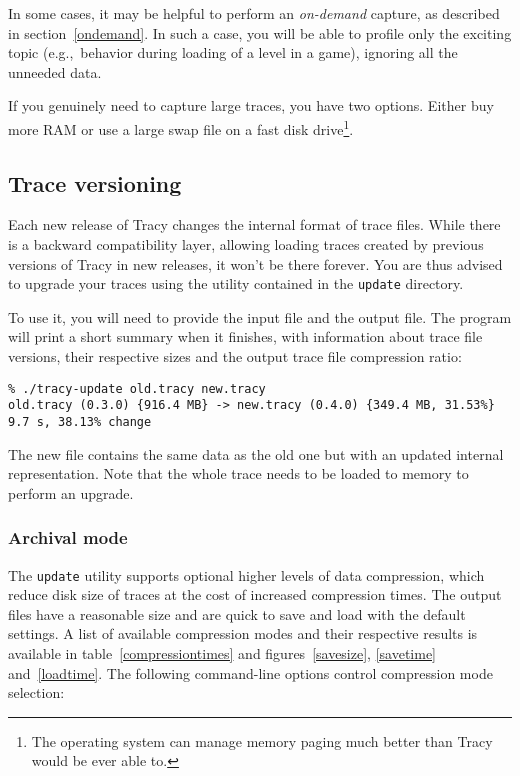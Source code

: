 \documentclass[hidelinks,titlepage,a4paper,twoside]{article}
\begin{document}
In some cases, it may be helpful to perform an \emph{on-demand} capture, as described in section~\ref{ondemand}. In such a case, you will be able to profile only the exciting topic (e.g.,\ behavior during loading of a level in a game), ignoring all the unneeded data.

If you genuinely need to capture large traces, you have two options. Either buy more RAM or use a large swap file on a fast disk drive\footnote{The operating system can manage memory paging much better than Tracy would be ever able to.}.

\subsection{Trace versioning}

Each new release of Tracy changes the internal format of trace files. While there is a backward compatibility layer, allowing loading traces created by previous versions of Tracy in new releases, it won't be there forever. You are thus advised to upgrade your traces using the utility contained in the \texttt{update} directory.

To use it, you will need to provide the input file and the output file. The program will print a short summary when it finishes, with information about trace file versions, their respective sizes and the output trace file compression ratio:

\begin{verbatim}
% ./tracy-update old.tracy new.tracy
old.tracy (0.3.0) {916.4 MB} -> new.tracy (0.4.0) {349.4 MB, 31.53%}  9.7 s, 38.13% change
\end{verbatim}

The new file contains the same data as the old one but with an updated internal representation. Note that the whole trace needs to be loaded to memory to perform an upgrade.

\subsubsection{Archival mode}
\label{archival}

The \texttt{update} utility supports optional higher levels of data compression, which reduce disk size of traces at the cost of increased compression times. The output files have a reasonable size and are quick to save and load with the default settings. A list of available compression modes and their respective results is available in table~\ref{compressiontimes} and figures~\ref{savesize}, \ref{savetime} and~\ref{loadtime}. The following command-line options control compression mode selection:
\end{document}
